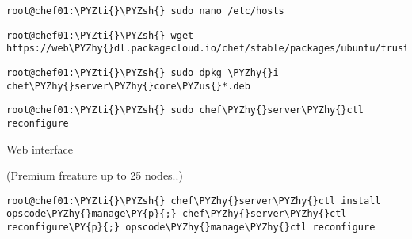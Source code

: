 
\begin{codelisting}
\label{code:}
\codecaption{}
\begin{Verbatim}[fontsize=\relsize{-2.5},fontseries=b,commandchars=\\\{\}]
root@chef01:\PYZti{}\PYZsh{} sudo nano /etc/hosts
\end{Verbatim}
\end{codelisting}


\begin{codelisting}
\label{code:}
\codecaption{}
\begin{Verbatim}[fontsize=\relsize{-2.5},fontseries=b,commandchars=\\\{\}]
root@chef01:\PYZti{}\PYZsh{} wget https://web\PYZhy{}dl.packagecloud.io/chef/stable/packages/ubuntu/trusty/chef\PYZhy{}server\PYZhy{}core\PYZus{}12.2.0\PYZhy{}1\PYZus{}amd64.deb
\end{Verbatim}
\end{codelisting}


\begin{codelisting}
\label{code:}
\codecaption{}
\begin{Verbatim}[fontsize=\relsize{-2.5},fontseries=b,commandchars=\\\{\}]
root@chef01:\PYZti{}\PYZsh{} sudo dpkg \PYZhy{}i chef\PYZhy{}server\PYZhy{}core\PYZus{}*.deb
\end{Verbatim}
\end{codelisting}


\begin{codelisting}
\label{code:}
\codecaption{}
\begin{Verbatim}[fontsize=\relsize{-2.5},fontseries=b,commandchars=\\\{\}]
root@chef01:\PYZti{}\PYZsh{} sudo chef\PYZhy{}server\PYZhy{}ctl reconfigure
\end{Verbatim}
\end{codelisting}


Web interface


(Premium freature up to 25 nodes..)
\begin{codelisting}
\label{code:}
\codecaption{}
\begin{Verbatim}[fontsize=\relsize{-2.5},fontseries=b,commandchars=\\\{\}]
root@chef01:\PYZti{}\PYZsh{} chef\PYZhy{}server\PYZhy{}ctl install opscode\PYZhy{}manage\PY{p}{;} chef\PYZhy{}server\PYZhy{}ctl reconfigure\PY{p}{;} opscode\PYZhy{}manage\PYZhy{}ctl reconfigure
\end{Verbatim}
\end{codelisting}

